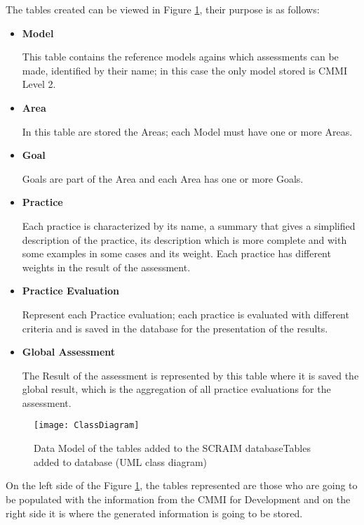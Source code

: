 The tables created can be viewed in Figure \ref{fig:database}, their purpose is as follows:
\begin{itemize}
	\item \textbf{Model}
	
	This table contains the reference models agains which assessments can be made, identified by their name; in this case the only model stored is CMMI Level 2.
	\item \textbf{Area}
	
	In this table are stored the Areas; each Model must have one or more Areas.
	\item \textbf{Goal}
	
	Goals are part of the Area and each Area has one or more Goals.
	\item \textbf{Practice}
	
	Each practice is characterized by its name, a summary that gives a simplified description of the practice, its description which is more complete and with some examples in some cases and its weight. Each practice has different weights in the result of the assessment.
	
	\item \textbf{Practice Evaluation}
	
	Represent each Practice evaluation; each practice is evaluated with different criteria and is saved in the database for the presentation of the results.
	
	\item \textbf{Global Assessment}
	
	The Result of the assessment is represented by this table where it is saved the global result, which is the aggregation of all practice evaluations for the assessment.
	
\end{itemize}

\begin{figure}[!htb]
	\begin{center}
		\leavevmode
		\texttt{[image: ClassDiagram]}
		\caption{Data Model of the tables added to the SCRAIM databaseTables added to database (UML class diagram)}
		\label{fig:database}
	\end{center}
\end{figure}


On the left side of the Figure \ref{fig:database}, the tables represented are those who are going to be populated with the information from the CMMI for Development and on the right side it is where the generated information is going to be stored.


